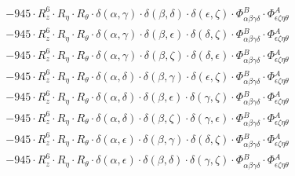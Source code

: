 \documentclass{article}
\begin{document}
\begin{equation}
\begin{array}{c}
 \\[0.2em] 		 - 945 \cdot R_{z}^{6} \cdot R_{\eta{}} \cdot R_{\theta{}} \cdot \delta{}\left(\alpha{}, \gamma{}\right) \cdot \delta{}\left(\beta{}, \delta{}\right) \cdot \delta{}\left(\epsilon{}, \zeta{}\right) \cdot \Phi{}^{B}_{\alpha{}\beta{}\gamma{}\delta{}} \cdot \Phi{}^{A}_{\epsilon{}\zeta{}\eta{}\theta{}} 
 \\[0.2em] 		 - 945 \cdot R_{z}^{6} \cdot R_{\eta{}} \cdot R_{\theta{}} \cdot \delta{}\left(\alpha{}, \gamma{}\right) \cdot \delta{}\left(\beta{}, \epsilon{}\right) \cdot \delta{}\left(\delta{}, \zeta{}\right) \cdot \Phi{}^{B}_{\alpha{}\beta{}\gamma{}\delta{}} \cdot \Phi{}^{A}_{\epsilon{}\zeta{}\eta{}\theta{}} 
 \\[0.2em] 		 - 945 \cdot R_{z}^{6} \cdot R_{\eta{}} \cdot R_{\theta{}} \cdot \delta{}\left(\alpha{}, \gamma{}\right) \cdot \delta{}\left(\beta{}, \zeta{}\right) \cdot \delta{}\left(\delta{}, \epsilon{}\right) \cdot \Phi{}^{B}_{\alpha{}\beta{}\gamma{}\delta{}} \cdot \Phi{}^{A}_{\epsilon{}\zeta{}\eta{}\theta{}} 
 \\[0.2em] 		 - 945 \cdot R_{z}^{6} \cdot R_{\eta{}} \cdot R_{\theta{}} \cdot \delta{}\left(\alpha{}, \delta{}\right) \cdot \delta{}\left(\beta{}, \gamma{}\right) \cdot \delta{}\left(\epsilon{}, \zeta{}\right) \cdot \Phi{}^{B}_{\alpha{}\beta{}\gamma{}\delta{}} \cdot \Phi{}^{A}_{\epsilon{}\zeta{}\eta{}\theta{}} 
 \\[0.2em] 		 - 945 \cdot R_{z}^{6} \cdot R_{\eta{}} \cdot R_{\theta{}} \cdot \delta{}\left(\alpha{}, \delta{}\right) \cdot \delta{}\left(\beta{}, \epsilon{}\right) \cdot \delta{}\left(\gamma{}, \zeta{}\right) \cdot \Phi{}^{B}_{\alpha{}\beta{}\gamma{}\delta{}} \cdot \Phi{}^{A}_{\epsilon{}\zeta{}\eta{}\theta{}} 
 \\[0.2em] 		 - 945 \cdot R_{z}^{6} \cdot R_{\eta{}} \cdot R_{\theta{}} \cdot \delta{}\left(\alpha{}, \delta{}\right) \cdot \delta{}\left(\beta{}, \zeta{}\right) \cdot \delta{}\left(\gamma{}, \epsilon{}\right) \cdot \Phi{}^{B}_{\alpha{}\beta{}\gamma{}\delta{}} \cdot \Phi{}^{A}_{\epsilon{}\zeta{}\eta{}\theta{}} 
 \\[0.2em] 		 - 945 \cdot R_{z}^{6} \cdot R_{\eta{}} \cdot R_{\theta{}} \cdot \delta{}\left(\alpha{}, \epsilon{}\right) \cdot \delta{}\left(\beta{}, \gamma{}\right) \cdot \delta{}\left(\delta{}, \zeta{}\right) \cdot \Phi{}^{B}_{\alpha{}\beta{}\gamma{}\delta{}} \cdot \Phi{}^{A}_{\epsilon{}\zeta{}\eta{}\theta{}} 
 \\[0.2em] 		 - 945 \cdot R_{z}^{6} \cdot R_{\eta{}} \cdot R_{\theta{}} \cdot \delta{}\left(\alpha{}, \epsilon{}\right) \cdot \delta{}\left(\beta{}, \delta{}\right) \cdot \delta{}\left(\gamma{}, \zeta{}\right) \cdot \Phi{}^{B}_{\alpha{}\beta{}\gamma{}\delta{}} \cdot \Phi{}^{A}_{\epsilon{}\zeta{}\eta{}\theta{}} 

\end{array}
\end{equation}
\end{document}
